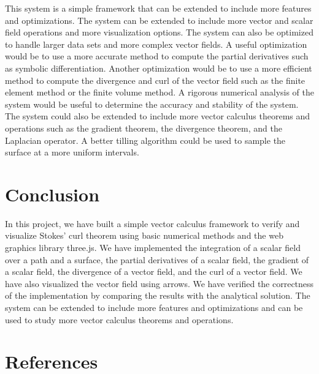 \documentclass[12pt]{article}
\begin{document}
This system is a simple framework that can be extended to include more features and optimizations. The system can be extended to include more vector and scalar field operations and more visualization options. The system can also be optimized to handle larger data sets and more complex vector fields.
A useful optimization would be to use a more accurate method to compute the partial derivatives such as symbolic differentiation. Another optimization would be to use a more efficient method to compute the divergence and curl of the vector field such as the finite element method\cite{FEM} or the finite volume method\cite{Finite_Volume_Methods}.
A rigorous numerical analysis of the system would be useful to determine the accuracy and stability of the system. The system could also be extended to include more vector calculus theorems and operations such as the gradient theorem, the divergence theorem, and the Laplacian operator.
A better tilling algorithm could be used to sample the surface at a more uniform intervals.


\newpage
\section{Conclusion}

In this project, we have built a simple vector calculus framework to verify and visualize Stokes' curl theorem using basic numerical methods and the web graphics library three.js. We have implemented the integration of a scalar field over a path and a surface, the partial derivatives of a scalar field, the gradient of a scalar field, the divergence of a vector field, and the curl of a vector field. We have also visualized the vector field using arrows. We have verified the correctness of the implementation by comparing the results with the analytical solution. The system can be extended to include more features and optimizations and can be used to study more vector calculus theorems and operations.

\newpage
\section{References}


\nocite{El-Deeb_PEU-218_Assignments}
\nocite{El-Deeb_PEU-218_Stokes_Threejs}
\end{document}
